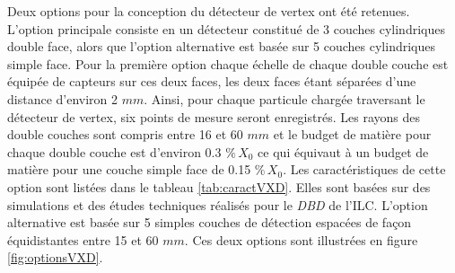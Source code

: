   \medskip
  
  Deux options pour la conception du d\'etecteur de vertex ont \'et\'e retenues. L'option principale consiste en un d\'etecteur constitu\'e de 3 couches cylindriques double face, alors que l'option alternative est bas\'ee sur 5 couches cylindriques simple face. Pour la premi\`ere option chaque \'echelle de chaque double couche est \'equip\'ee de capteurs sur ces deux faces, les deux faces \'etant s\'epar\'ees d'une distance d'environ 2 $mm$. Ainsi, pour chaque particule charg\'ee traversant le d\'etecteur de vertex, six points de mesure seront enregistr\'es. Les rayons des double couches sont compris entre 16 et 60 $mm$ et le budget de mati\`ere pour chaque double couche est d'environ 0.3 $\% \, X_0$ ce qui \'equivaut \`a un budget de mati\`ere pour une couche simple face de 0.15 $\% \, X_0$. Les caract\'eristiques de cette option sont list\'ees dans le tableau \ref{tab:caractVXD}. Elles sont bas\'ees sur des simulations et des \'etudes techniques r\'ealis\'es pour le \textit{DBD} de l'ILC. L'option alternative est bas\'ee sur 5 simples couches de d\'etection espac\'ees de fa\c{c}on équidistantes entre 15 et 60 $mm$. Ces deux options sont illustr\'ees en figure \ref{fig:optionsVXD}. 
  
  \medskip
  
  
  \medskip
  
